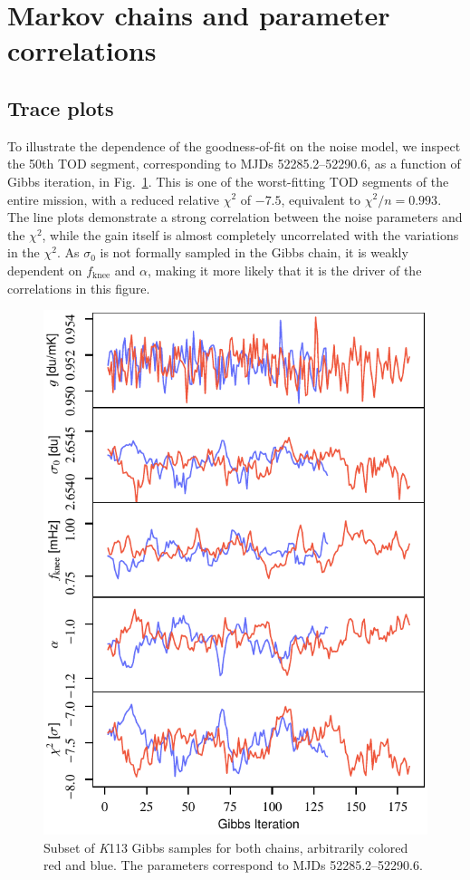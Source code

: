 \documentclass[twocolumn]{../../common/aa}
\newcommand{\K}[0]{\textit K}
\begin{document}
\section{Markov chains and parameter correlations}
\label{sec:markov}


\subsection{Trace plots}
\label{sec:traceplots}

To illustrate the dependence of the goodness-of-fit on the noise model,
we inspect the 50th TOD segment, corresponding to MJDs 52285.2--52290.6, as a
function of Gibbs iteration, in Fig.~\ref{fig:inst_K113_gibbs}. This is one of
the worst-fitting TOD segments of the entire mission, with a reduced relative
$\chi^2$ of $-7.5$, equivalent to $\chi^2/n=0.993$. The line plots demonstrate a strong correlation between the noise parameters and the $\chi^2$, while the gain itself is almost completely uncorrelated with the variations in the $\chi^2$. As $\sigma_0$ is not formally sampled in the Gibbs chain, it is weakly dependent on $f_\mathrm{knee}$ and $\alpha$, making it more likely that it is the driver of the correlations in this figure. 

\begin{figure}[t]
  	\centering
	\includegraphics[width=\linewidth]{figures/instpar_CG_K113_samples_v1.pdf}
	\caption{Subset of \K113 Gibbs samples for both chains, arbitrarily colored red and blue. The parameters correspond to MJDs 52285.2--52290.6.}
	\label{fig:inst_K113_gibbs}
\end{figure}
\end{document}
